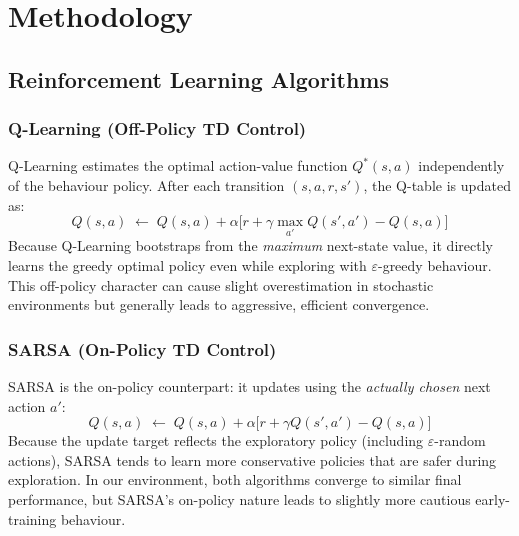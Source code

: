 \documentclass[12pt]{article}
\begin{document}
\section{Methodology}

\subsection{Reinforcement Learning Algorithms}

\subsubsection{Q-Learning (Off-Policy TD Control)}
Q-Learning \cite{watkins1992} estimates the optimal action-value function $Q^*(s,a)$
independently of the behaviour policy. After each transition $(s, a, r, s')$, the
Q-table is updated as:
\[
    Q(s,a) \;\leftarrow\; Q(s,a) + \alpha\bigl[r + \gamma\max_{a'} Q(s',a') - Q(s,a)\bigr]
\]
Because Q-Learning bootstraps from the \emph{maximum} next-state value, it directly
learns the greedy optimal policy even while exploring with $\varepsilon$-greedy
behaviour. This off-policy character can cause slight overestimation in stochastic
environments but generally leads to aggressive, efficient convergence.

\subsubsection{SARSA (On-Policy TD Control)}
SARSA \cite{rummery1994} is the on-policy counterpart: it updates using the
\emph{actually chosen} next action $a'$:
\[
    Q(s,a) \;\leftarrow\; Q(s,a) + \alpha\bigl[r + \gamma Q(s',a') - Q(s,a)\bigr]
\]
Because the update target reflects the exploratory policy (including $\varepsilon$-random
actions), SARSA tends to learn more conservative policies that are safer during
exploration. In our environment, both algorithms converge to similar final performance,
but SARSA's on-policy nature leads to slightly more cautious early-training behaviour.
\end{document}
